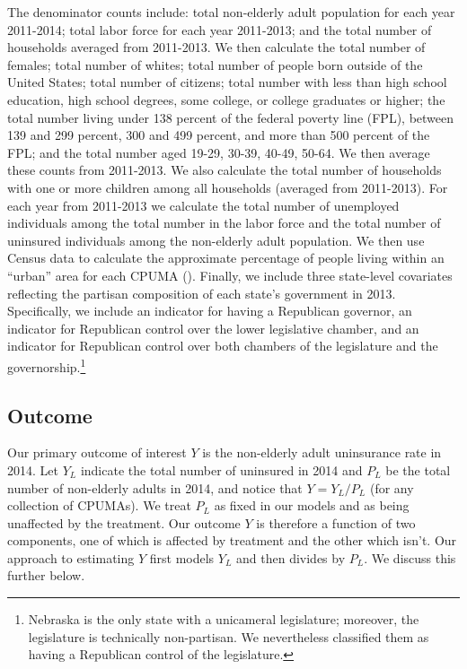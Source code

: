 \documentclass[12pt]{article}
\begin{document}
The denominator counts include: total non-elderly adult population for each year 2011-2014; total labor force for each year 2011-2013; and the total number of households averaged from 2011-2013. We then calculate the total number of females; total number of whites; total number of people born outside of the United States; total number of citizens; total number with less than high school education, high school degrees, some college, or college graduates or higher; the total number living under 138 percent of the federal poverty line (FPL), between 139 and 299 percent, 300 and 499 percent, and more than 500 percent of the FPL; and the total number aged 19-29, 30-39, 40-49, 50-64. We then average these counts from 2011-2013. We also calculate the total number of households with one or more children among all households (averaged from 2011-2013). For each year from 2011-2013 we calculate the total number of unemployed individuals among the total number in the labor force and the total number of uninsured individuals among the non-elderly adult population. We then use Census data to calculate the approximate percentage of people living within an ``urban'' area for each CPUMA (\cite{census}). Finally, we include three state-level covariates reflecting the partisan composition of each state's government in 2013. Specifically, we include an indicator for having a Republican governor, an indicator for Republican control over the lower legislative chamber, and an indicator for Republican control over both chambers of the legislature and the governorship.\footnote{Nebraska is the only state with a unicameral legislature; moreover, the legislature is technically non-partisan. We nevertheless classified them as having a Republican control of the legislature.} 

\subsection{Outcome}

Our primary outcome of interest $Y$ is the non-elderly adult uninsurance rate in 2014. Let $Y_L$ indicate the total number of uninsured in 2014 and $P_L$ be the total number of non-elderly adults in 2014, and notice that $Y = Y_L/P_L$ (for any collection of CPUMAs). We treat $P_L$ as fixed in our models and as being unaffected by the treatment. Our outcome $Y$ is therefore a function of two components, one of which is affected by treatment and the other which isn't. Our approach to estimating $Y$ first models $Y_L$ and then divides by $P_L$. We discuss this further below.
\end{document}
